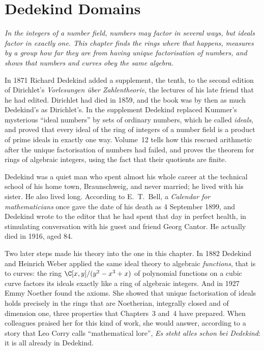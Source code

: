 \chapter{Dedekind Domains}

\begin{center}\itshape
In the integers of a number field, numbers may factor in several ways, but ideals factor in exactly one. This chapter finds the rings where that happens, measures by a group how far they are from having
unique factorisation of numbers, and shows that numbers and curves obey the same algebra.
\end{center}

In 1871 Richard Dedekind added a supplement, the tenth, to the second edition of Dirichlet's \emph{Vorlesungen über Zahlentheorie}, the lectures of his late friend that he had edited. Dirichlet had
died in 1859, and the book was by then as much Dedekind's as Dirichlet's. In the supplement Dedekind replaced Kummer's mysterious ``ideal numbers'' by sets of ordinary numbers, which he called \emph{ideals}, and proved that every
ideal of the ring of integers of a number field is a product of prime ideals in exactly one way. Volume~12 tells how this rescued arithmetic after the unique factorisation of numbers had failed, and proves the theorem for
rings of algebraic integers, using the fact that their quotients are finite.

Dedekind was a quiet man who spent almost his whole career at the technical school of his home town, Braunschweig, and never married; he lived with his sister. He also lived long. According to E.~T.~Bell, a
\emph{Calendar for mathematicians} once gave the date of his death as 4 September 1899, and Dedekind wrote to the editor that he had spent that day in perfect health, in stimulating conversation with his guest and
friend Georg Cantor. He actually died in 1916, aged 84.

Two later steps made his theory into the one in this chapter. In 1882 Dedekind and Heinrich Weber applied the same ideal theory to algebraic \emph{functions}, that is to curves: the ring $\C[x,y]/(y^2-x^3+x)$ of
polynomial functions on a cubic curve factors its ideals exactly like a ring of algebraic integers. And in 1927 Emmy Noether found the axioms. She showed that unique factorisation of ideals holds precisely in the
rings that are Noetherian, integrally closed and of dimension one, three properties that Chapters~3 and~4 have prepared. When colleagues praised her for this kind of work, she would answer, according to a story
that Leo Corry calls ``mathematical lore'', \emph{Es steht alles schon bei Dedekind}: it is all already in Dedekind.

